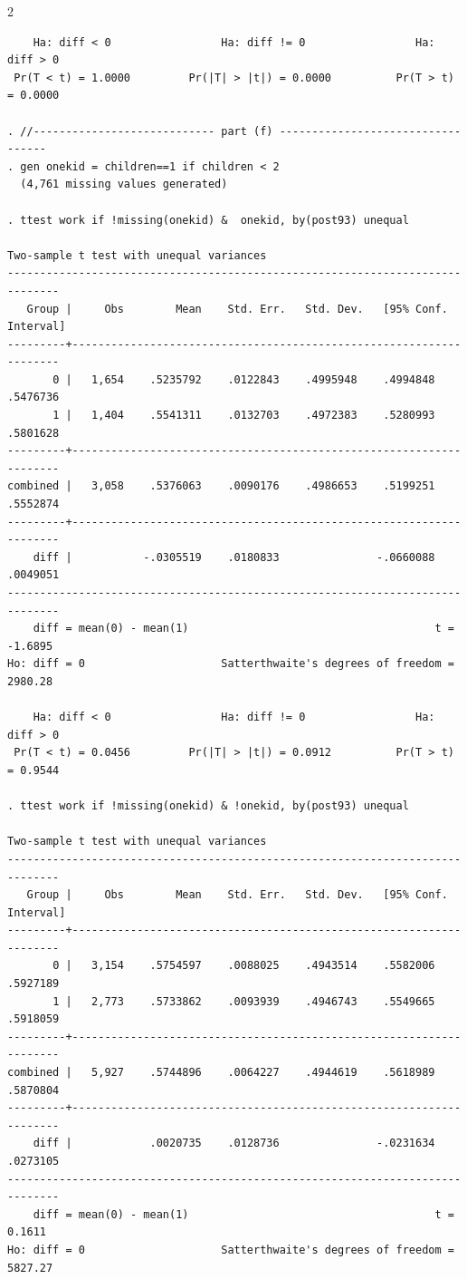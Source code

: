 \documentclass{article}
\newenvironment{changemargin}[2]{%
\begin{list}{}{%
\setlength{\topsep}{0pt}%
\setlength{\leftmargin}{#1}%
\setlength{\rightmargin}{#2}%
\setlength{\listparindent}{\parindent}%
\setlength{\itemindent}{\parindent}%
\setlength{\parsep}{\parskip}%
}%
\item[]}{\end{list}}
\begin{document}
\begin{changemargin}{-0.5in}{-0.5in}
\begin{multicols}{2}
\begin{verbatim}
    Ha: diff < 0                 Ha: diff != 0                 Ha: diff > 0
 Pr(T < t) = 1.0000         Pr(|T| > |t|) = 0.0000          Pr(T > t) = 0.0000

. //---------------------------- part (f) ----------------------------------
. gen onekid = children==1 if children < 2
  (4,761 missing values generated)

. ttest work if !missing(onekid) &  onekid, by(post93) unequal

Two-sample t test with unequal variances
------------------------------------------------------------------------------
   Group |     Obs        Mean    Std. Err.   Std. Dev.   [95% Conf. Interval]
---------+--------------------------------------------------------------------
       0 |   1,654    .5235792    .0122843    .4995948    .4994848    .5476736
       1 |   1,404    .5541311    .0132703    .4972383    .5280993    .5801628
---------+--------------------------------------------------------------------
combined |   3,058    .5376063    .0090176    .4986653    .5199251    .5552874
---------+--------------------------------------------------------------------
    diff |           -.0305519    .0180833               -.0660088    .0049051
------------------------------------------------------------------------------
    diff = mean(0) - mean(1)                                      t =  -1.6895
Ho: diff = 0                     Satterthwaite's degrees of freedom =  2980.28

    Ha: diff < 0                 Ha: diff != 0                 Ha: diff > 0
 Pr(T < t) = 0.0456         Pr(|T| > |t|) = 0.0912          Pr(T > t) = 0.9544

. ttest work if !missing(onekid) & !onekid, by(post93) unequal

Two-sample t test with unequal variances
------------------------------------------------------------------------------
   Group |     Obs        Mean    Std. Err.   Std. Dev.   [95% Conf. Interval]
---------+--------------------------------------------------------------------
       0 |   3,154    .5754597    .0088025    .4943514    .5582006    .5927189
       1 |   2,773    .5733862    .0093939    .4946743    .5549665    .5918059
---------+--------------------------------------------------------------------
combined |   5,927    .5744896    .0064227    .4944619    .5618989    .5870804
---------+--------------------------------------------------------------------
    diff |            .0020735    .0128736               -.0231634    .0273105
------------------------------------------------------------------------------
    diff = mean(0) - mean(1)                                      t =   0.1611
Ho: diff = 0                     Satterthwaite's degrees of freedom =  5827.27


\end{verbatim}
\end{multicols}
\end{changemargin}
\end{document}
